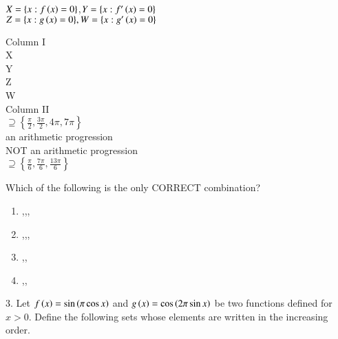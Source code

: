 \documentclass[journal,12pt,twocolumn]{IEEEtran}
\theoremstyle{remark}
\begin{document}
$X=\{x:f\left(x\right)=0\}$,$Y=\{x:f'\left(x\right)=0\}$\\
$Z=\{x:g\left(x\right)=0\}, W=\{x:g'\left(x\right)=0\}$
\\
\begin{multicols}{2}
Column I
\\
 X
\\
 Y
\\
 Z
\\
 W
\columnbreak
\\
Column II
\\
 $\supseteq \left\{ \frac{\pi}{2}, \frac{3\pi}{2}, 4\pi, 7\pi \right\}$
\\
an arithmetic progression
\\
NOT an arithmetic progression
\\
$\supseteq\left\{\frac{\pi}{6},\frac{7\pi}{6},\frac{13\pi}{6}\right\}$


\end{multicols}
Which of the following is the only CORRECT combination?
\\
\begin{enumerate}[label=\alph*]
\item{},,,
\item{},,,
\item{},,
\item{},,
\end{enumerate}


$3$. Let $f\left(x\right) = \sin\left(\pi \cos x\right)$ and $g\left(x\right) = \cos\left(2\pi \sin x\right)$ be two functions defined for $x > 0$. Define the following sets whose elements are written in the increasing order. \hfill{}
\end{document}
